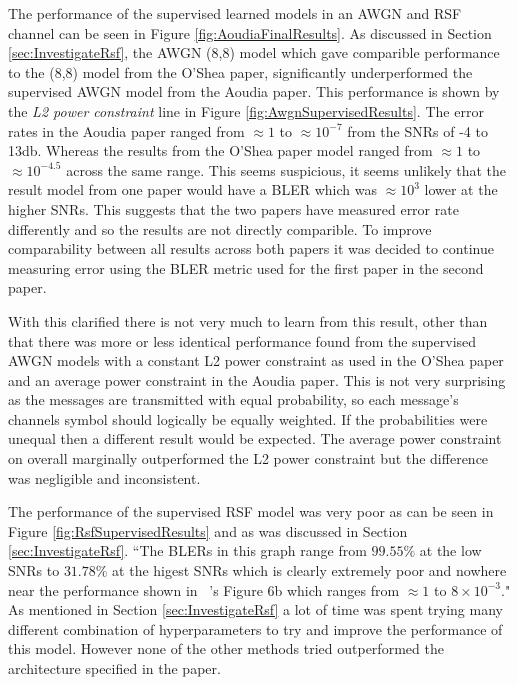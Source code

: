 \documentclass[12pt,onecolumn,letterpaper]{article}
\newcommand{\code}{\textit}
\begin{document}
The performance of the supervised learned models in an AWGN and RSF channel can be seen in Figure \ref{fig:AoudiaFinalResults}. As discussed in Section \ref{sec:InvestigateRsf}, the AWGN (8,8) model which gave comparible performance to the (8,8) model from the O'Shea paper, significantly underperformed the supervised AWGN model from the Aoudia paper. This performance is shown by the \code{L2 power constraint} line in Figure \ref{fig:AwgnSupervisedResults}. The error rates in the Aoudia paper ranged from $\approx 1$  to $\approx 10^{-7}$ from the SNRs of -4 to 13db. Whereas the results from the O'Shea paper model ranged from $\approx 1$  to $\approx 10^{-4.5}$ across the same range. This seems suspicious, it seems unlikely that the result model from one paper would have a BLER which was $\approx10^3$ lower at the higher SNRs. This suggests that the two papers have measured error rate differently and so the results are not directly comparible. To improve comparability between all results across both papers it was decided to continue measuring error using the BLER metric used for the first paper in the second paper. 

With this clarified there is not very much to learn from this result, other than that there was more or less identical performance found from the supervised AWGN models with a constant L2 power constraint as used in the O'Shea paper and an average power constraint in the Aoudia paper. This is not very surprising as the messages are transmitted with equal probability, so each message's channels symbol should logically be equally weighted. If the probabilities were unequal then a different result would be expected. The average power constraint on overall marginally outperformed the L2 power constraint but the difference was negligible and inconsistent.

The performance of the supervised RSF model was very poor as can be seen in Figure \ref{fig:RsfSupervisedResults} and as was discussed in Section \ref{sec:InvestigateRsf}. ``The BLERs in this graph range from $99.55\%$ at the low SNRs to $31.78\%$ at the higest SNRs which is clearly extremely poor and nowhere near the performance shown in ~\cite{Aoudia}'s Figure 6b which ranges from $\approx1$ to $8\times10^{-3}$." As mentioned in Section \ref{sec:InvestigateRsf} a lot of time was spent trying many different combination of hyperparameters to try and improve the performance of this model. However none of the other methods tried outperformed the architecture specified in the paper. 
\end{document}
